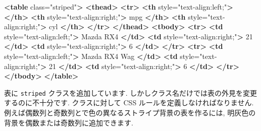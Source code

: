 \documentclass[
  11pt,
  lualatex,
  ja=standard]{bxjsreport}
\newenvironment{Shaded}{\begin{snugshade}}{\end{snugshade}}
\newcommand{\KeywordTok}[1]{\textcolor[rgb]{0.13,0.29,0.53}{\textbf{#1}}}
\newcommand{\NormalTok}[1]{#1}
\newcommand{\OtherTok}[1]{\textcolor[rgb]{0.56,0.35,0.01}{#1}}
\newcommand{\StringTok}[1]{\textcolor[rgb]{0.31,0.60,0.02}{#1}}
\begin{document}
\begin{Shaded}
\begin{Highlighting}[]
\KeywordTok{\textless{}table}\OtherTok{ class=}\StringTok{"striped"}\KeywordTok{\textgreater{}}
 \KeywordTok{\textless{}thead\textgreater{}}
  \KeywordTok{\textless{}tr\textgreater{}}
   \KeywordTok{\textless{}th}\OtherTok{ style=}\StringTok{"text{-}align:left;"}\KeywordTok{\textgreater{}}   \KeywordTok{\textless{}/th\textgreater{}}
   \KeywordTok{\textless{}th}\OtherTok{ style=}\StringTok{"text{-}align:right;"}\KeywordTok{\textgreater{}}\NormalTok{ mpg }\KeywordTok{\textless{}/th\textgreater{}}
   \KeywordTok{\textless{}th}\OtherTok{ style=}\StringTok{"text{-}align:right;"}\KeywordTok{\textgreater{}}\NormalTok{ cyl }\KeywordTok{\textless{}/th\textgreater{}}
  \KeywordTok{\textless{}/tr\textgreater{}}
 \KeywordTok{\textless{}/thead\textgreater{}}
\KeywordTok{\textless{}tbody\textgreater{}}
  \KeywordTok{\textless{}tr\textgreater{}}
   \KeywordTok{\textless{}td}\OtherTok{ style=}\StringTok{"text{-}align:left;"}\KeywordTok{\textgreater{}}\NormalTok{ Mazda RX4 }\KeywordTok{\textless{}/td\textgreater{}}
   \KeywordTok{\textless{}td}\OtherTok{ style=}\StringTok{"text{-}align:right;"}\KeywordTok{\textgreater{}}\NormalTok{ 21 }\KeywordTok{\textless{}/td\textgreater{}}
   \KeywordTok{\textless{}td}\OtherTok{ style=}\StringTok{"text{-}align:right;"}\KeywordTok{\textgreater{}}\NormalTok{ 6 }\KeywordTok{\textless{}/td\textgreater{}}
  \KeywordTok{\textless{}/tr\textgreater{}}
  \KeywordTok{\textless{}tr\textgreater{}}
   \KeywordTok{\textless{}td}\OtherTok{ style=}\StringTok{"text{-}align:left;"}\KeywordTok{\textgreater{}}\NormalTok{ Mazda RX4 Wag }\KeywordTok{\textless{}/td\textgreater{}}
   \KeywordTok{\textless{}td}\OtherTok{ style=}\StringTok{"text{-}align:right;"}\KeywordTok{\textgreater{}}\NormalTok{ 21 }\KeywordTok{\textless{}/td\textgreater{}}
   \KeywordTok{\textless{}td}\OtherTok{ style=}\StringTok{"text{-}align:right;"}\KeywordTok{\textgreater{}}\NormalTok{ 6 }\KeywordTok{\textless{}/td\textgreater{}}
  \KeywordTok{\textless{}/tr\textgreater{}}
\KeywordTok{\textless{}/tbody\textgreater{}}
\KeywordTok{\textless{}/table\textgreater{}}
\end{Highlighting}
\end{Shaded}

表に \texttt{striped} クラスを追加しています. しかしクラス名だけでは表の外見を変更するのに不十分です. クラスに対して CSS ルールを定義しなければなりません. 例えば偶数列と奇数列とで色の異なるストライプ背景の表を作るには, 明灰色の背景を偶数または奇数列に追加できます.
\end{document}
